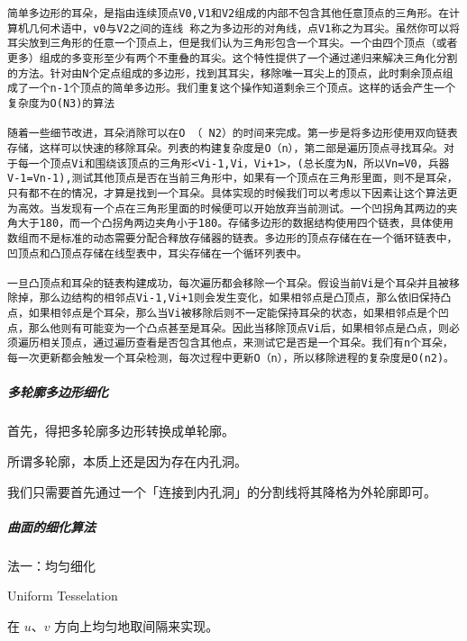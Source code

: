 \documentclass[
]{article}
\begin{document}
\begin{verbatim}
简单多边形的耳朵，是指由连续顶点V0,V1和V2组成的内部不包含其他任意顶点的三角形。在计算机几何术语中，v0与V2之间的连线 称之为多边形的对角线，点V1称之为耳尖。虽然你可以将耳尖放到三角形的任意一个顶点上，但是我们认为三角形包含一个耳尖。一个由四个顶点（或者更多）组成的多变形至少有两个不重叠的耳尖。这个特性提供了一个通过递归来解决三角化分割的方法。针对由N个定点组成的多边形，找到其耳尖，移除唯一耳尖上的顶点，此时剩余顶点组成了一个n-1个顶点的简单多边形。我们重复这个操作知道剩余三个顶点。这样的话会产生一个复杂度为O(N3)的算法

随着一些细节改进，耳朵消除可以在O （ N2）的时间来完成。第一步是将多边形使用双向链表存储，这样可以快速的移除耳朵。列表的构建复杂度是O（n），第二部是遍历顶点寻找耳朵。对于每一个顶点Vi和围绕该顶点的三角形<Vi-1,Vi，Vi+1>，(总长度为N，所以Vn=V0，兵器V-1=Vn-1),测试其他顶点是否在当前三角形中，如果有一个顶点在三角形里面，则不是耳朵，只有都不在的情况，才算是找到一个耳朵。具体实现的时候我们可以考虑以下因素让这个算法更为高效。当发现有一个点在三角形里面的时候便可以开始放弃当前测试。一个凹拐角其两边的夹角大于180，而一个凸拐角两边夹角小于180。存储多边形的数据结构使用四个链表，具体使用数组而不是标准的动态需要分配合释放存储器的链表。多边形的顶点存储在在一个循环链表中，凹顶点和凸顶点存储在线型表中，耳尖存储在一个循环列表中。

一旦凸顶点和耳朵的链表构建成功，每次遍历都会移除一个耳朵。假设当前Vi是个耳朵并且被移除掉，那么边结构的相邻点Vi-1,Vi+1则会发生变化，如果相邻点是凸顶点，那么依旧保持凸点，如果相邻点是个耳朵，那么当Vi被移除后则不一定能保持耳朵的状态，如果相邻点是个凹点，那么他则有可能变为一个凸点甚至是耳朵。因此当移除顶点Vi后，如果相邻点是凸点，则必须遍历相关顶点，通过遍历查看是否包含其他点，来测试它是否是一个耳朵。我们有n个耳朵，每一次更新都会触发一个耳朵检测，每次过程中更新O（n），所以移除进程的复杂度是O(n2)。
\end{verbatim}

\hypertarget{header-n96}{%
\subparagraph{多轮廓多边形细化}\label{header-n96}}

首先，得把多轮廓多边形转换成单轮廓。

所谓多轮廓，本质上还是因为存在内孔洞。

我们只需要首先通过一个「连接到内孔洞」的分割线将其降格为外轮廓即可。

\hypertarget{header-n100}{%
\subparagraph{曲面的细化算法}\label{header-n100}}

法一：均匀细化

Uniform Tesselation

在 \(u\)、\(v\) 方向上均匀地取间隔来实现。
\end{document}
